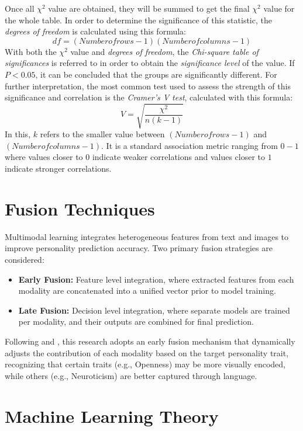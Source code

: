 Once all $\chi^2$ value are obtained, they will be summed to get the final $\chi^2$ value for the whole table. In order to determine the significance of this statistic, the \textit{degrees of freedom} is calculated using this formula:
$$df = (Number of rows - 1)(Number of columns - 1)$$
With both the $\chi^2$ value and \textit{degrees of freedom}, the \textit{Chi-square table of significances} is referred to in order to obtain the \textit{significance level} of the value. If $P < 0.05$, it can be concluded that the groups are significantly different. For further interpretation, the most common test used to assess the strength of this significance and correlation is the \textit{Cramer’s V test}, calculated with this formula:
$$V = \sqrt{ \frac{ \chi^2 }{ n(k - 1) } }$$
In this, $k$ refers to the smaller value between $(Number of rows - 1)$ and $(Number of columns - 1)$. It is a standard association metric ranging from $0-1$ where values closer to $0$ indicate weaker correlations and values closer to $1$ indicate stronger correlations.

\section{Fusion Techniques}

Multimodal learning integrates heterogeneous features from text and images to improve personality prediction accuracy. Two primary fusion strategies are considered:

\begin{itemize}
	\item \textbf{Early Fusion:} Feature level integration, where extracted features from each modality are concatenated into a unified vector prior to model training.
	\item \textbf{Late Fusion:} Decision level integration, where separate models are trained per modality, and their outputs are combined for final prediction.
\end{itemize}

Following \citet{liu2022} and \citet{kampman2018}, this research adopts an early fusion mechanism that dynamically adjusts the contribution of each modality based on the target personality trait, recognizing that certain traits (e.g., Openness) may be more visually encoded, while others (e.g., Neuroticism) are better captured through language.

\section{Machine Learning Theory}

